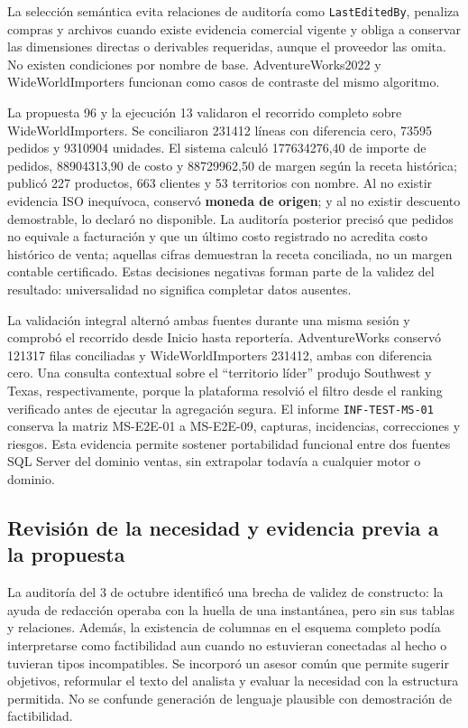 \documentclass[11pt,letterpaper]{article}
\newcommand{\file}[1]{\texttt{#1}}
\begin{document}
La selección semántica evita relaciones de auditoría como \file{LastEditedBy}, penaliza compras y archivos cuando existe evidencia comercial vigente y obliga a conservar las dimensiones directas o derivables requeridas, aunque el proveedor las omita. No existen condiciones por nombre de base. AdventureWorks2022 y WideWorldImporters funcionan como casos de contraste del mismo algoritmo.

La propuesta 96 y la ejecución 13 validaron el recorrido completo sobre WideWorldImporters. Se conciliaron 231412 líneas con diferencia cero, 73595 pedidos y 9310904 unidades. El sistema calculó 177634276,40 de importe de pedidos, 88904313,90 de costo y 88729962,50 de margen según la receta histórica; publicó 227 productos, 663 clientes y 53 territorios con nombre. Al no existir evidencia ISO inequívoca, conservó \textbf{moneda de origen}; y al no existir descuento demostrable, lo declaró no disponible. La auditoría posterior precisó que pedidos no equivale a facturación y que un último costo registrado no acredita costo histórico de venta; aquellas cifras demuestran la receta conciliada, no un margen contable certificado. Estas decisiones negativas forman parte de la validez del resultado: universalidad no significa completar datos ausentes.

La validación integral alternó ambas fuentes durante una misma sesión y comprobó el
recorrido desde Inicio hasta reportería. AdventureWorks conservó 121317 filas conciliadas
y WideWorldImporters 231412, ambas con diferencia cero. Una consulta contextual sobre el
``territorio líder'' produjo Southwest y Texas, respectivamente, porque la plataforma
resolvió el filtro desde el ranking verificado antes de ejecutar la agregación segura. El
informe \file{INF-TEST-MS-01} conserva la matriz MS-E2E-01 a MS-E2E-09, capturas,
incidencias, correcciones y riesgos. Esta evidencia permite sostener portabilidad funcional
entre dos fuentes SQL Server del dominio ventas, sin extrapolar todavía a cualquier motor
o dominio.

\subsection{Revisión de la necesidad y evidencia previa a la propuesta}

La auditoría del 3 de octubre identificó una brecha de validez de constructo: la ayuda
de redacción operaba con la huella de una instantánea, pero sin sus tablas y relaciones.
Además, la existencia de columnas en el esquema completo podía interpretarse como
factibilidad aun cuando no estuvieran conectadas al hecho o tuvieran tipos incompatibles.
Se incorporó un asesor común que permite sugerir objetivos, reformular el texto del
analista y evaluar la necesidad con la estructura permitida. No se confunde generación
de lenguaje plausible con demostración de factibilidad.
\end{document}
